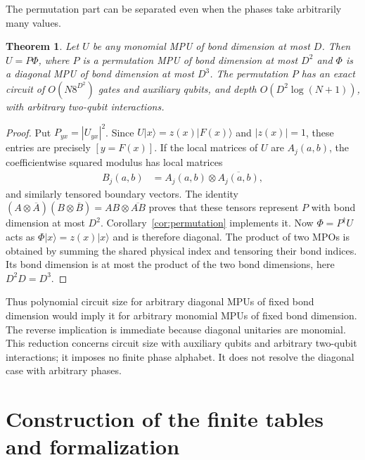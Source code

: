 \documentclass[11pt]{article}
\newtheorem{theorem}{Theorem}
\begin{document}
The permutation part can be separated even when the phases take arbitrarily
many values.

\begin{theorem}\label{thm:diagonal-reduction}
Let $U$ be any monomial MPU of bond dimension at most $D$.
Then $U=P\Phi$, where $P$ is a permutation MPU of bond dimension at most
$D^2$ and $\Phi$ is a diagonal MPU of bond dimension at most $D^3$.
The permutation $P$ has an exact circuit of $O(N8^{D^2})$ gates and auxiliary
qubits, and depth $O(D^2\log(N+1))$, with arbitrary two-qubit interactions.
\end{theorem}

\begin{proof}
Put $P_{yx}=|U_{yx}|^2$. Since $U|x\rangle=z(x)|F(x)\rangle$ and
$|z(x)|=1$, these entries are precisely $[y=F(x)]$.
If the local matrices of $U$ are $A_j(a,b)$, the coefficientwise squared
modulus has local matrices
\begin{align}
 B_j(a,b)&=A_j(a,b)\otimes\overline{A_j(a,b)},
 \label{eq:support-tensor}
\end{align}
and similarly tensored boundary vectors. The identity
$(A\otimes\overline A)(B\otimes\overline B)
=AB\otimes\overline{AB}$ proves that these tensors represent $P$ with
bond dimension at most $D^2$. Corollary~\ref{cor:permutation} implements it.
Now $\Phi=P^\dagger U$ acts as
$\Phi|x\rangle=z(x)|x\rangle$ and is therefore diagonal.
The product of two MPOs is obtained by summing the shared physical index
and tensoring their bond indices. Its bond dimension is at most the product
of the two bond dimensions, here $D^2D=D^3$.
\end{proof}

Thus polynomial circuit size for arbitrary diagonal MPUs of fixed bond
dimension would imply it for arbitrary monomial MPUs of fixed bond dimension.
The reverse implication is immediate because diagonal unitaries are
monomial. This reduction concerns circuit size with auxiliary qubits and
arbitrary two-qubit interactions; it imposes no finite phase alphabet.
It does not resolve the diagonal case with arbitrary phases.

\section{Construction of the finite tables and formalization}
\end{document}
